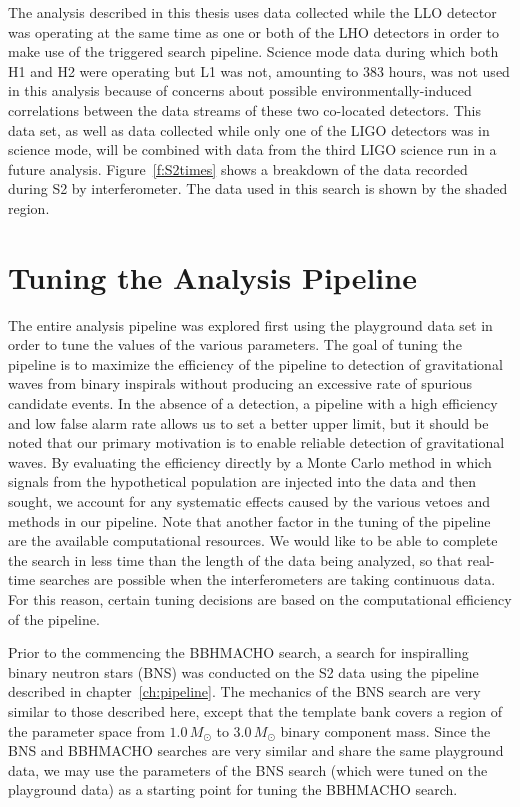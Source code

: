 The analysis described in this thesis uses data collected while the LLO
detector was operating at the same time as one or both of the LHO detectors in
order to make use of the triggered search pipeline.  Science mode data during
which both H1 and H2 were operating but L1 was not, amounting to 383 hours,
was not used in this analysis because of concerns about possible
environmentally-induced correlations between the data streams of these two
co-located detectors. This data set, as well as data collected while only one
of the LIGO detectors was in science mode, will be combined with data from the
third LIGO science run in a future analysis. Figure~\ref{f:S2times} shows a
breakdown of the data recorded during S2 by interferometer. The data used in
this search is shown by the shaded region.

\section{Tuning the Analysis Pipeline}
\label{s:s2tuning}

The entire analysis pipeline was explored first using the playground data set
in order to tune the values of the various parameters. The goal of tuning the
pipeline is to maximize the efficiency of the pipeline to detection of
gravitational waves from binary inspirals without producing an excessive rate
of spurious candidate events. In the absence of a detection, a pipeline with a
high efficiency and low false alarm rate allows us to set a better upper
limit, but it should be noted that our primary motivation is to enable
reliable detection of gravitational waves. By evaluating the efficiency
directly by a Monte Carlo method in which signals from the hypothetical
population are injected into the data and then sought, we account for any
systematic effects caused by the various vetoes and methods in our pipeline.
Note that another factor in the tuning of the pipeline are the available
computational resources. We would like to be able to complete the search in
less time than the length of the data being analyzed, so that real-time
searches are possible when the interferometers are taking continuous data. For
this reason, certain tuning decisions are based on the computational
efficiency of the pipeline.

Prior to the commencing the BBHMACHO search, a search for inspiralling binary
neutron stars (BNS) was conducted on the S2 data\cite{LIGOS2iul} using the
pipeline described in chapter~\ref{ch:pipeline}. The mechanics of the BNS
search are very similar to those described here, except that the template bank
covers a region of the parameter space from $1.0\,M_\odot$ to $3.0\,M_\odot$
binary component mass. Since the BNS and BBHMACHO searches are very similar
and share the same playground data, we may use the parameters of the BNS
search (which were tuned on the playground data) as a starting point for
tuning the BBHMACHO search. 

